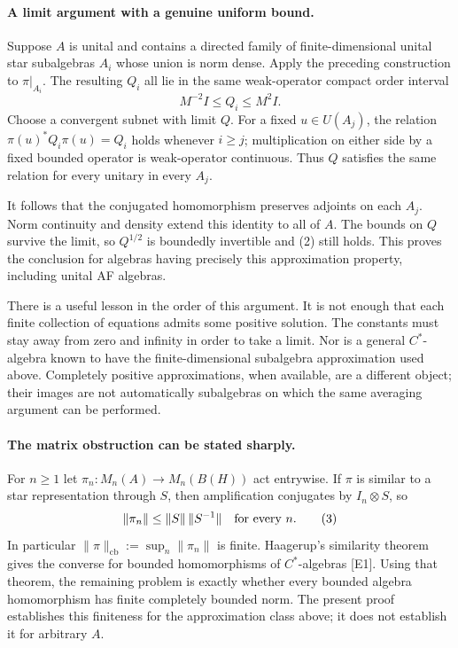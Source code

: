\documentclass[11pt]{article}
\begin{document}
\paragraph{A limit argument with a genuine uniform bound.}
Suppose $A$ is unital and contains a directed family of finite-dimensional unital star subalgebras $A_i$ whose union is norm dense. Apply the preceding construction to $\pi|_{A_i}$. The resulting $Q_i$ all lie in the same weak-operator compact order interval
\[
 M^{-2}I\le Q_i\le M^2I.
\]
Choose a convergent subnet with limit $Q$. For a fixed $u\in U(A_j)$, the relation $\pi(u)^*Q_i\pi(u)=Q_i$ holds whenever $i\ge j$; multiplication on either side by a fixed bounded operator is weak-operator continuous. Thus $Q$ satisfies the same relation for every unitary in every $A_j$.

It follows that the conjugated homomorphism preserves adjoints on each $A_j$. Norm continuity and density extend this identity to all of $A$. The bounds on $Q$ survive the limit, so $Q^{1/2}$ is boundedly invertible and (2) still holds. This proves the conclusion for algebras having precisely this approximation property, including unital AF algebras.

There is a useful lesson in the order of this argument. It is not enough that each finite collection of equations admits some positive solution. The constants must stay away from zero and infinity in order to take a limit. Nor is a general $C^*$-algebra known to have the finite-dimensional subalgebra approximation used above. Completely positive approximations, when available, are a different object; their images are not automatically subalgebras on which the same averaging argument can be performed.

\paragraph{The matrix obstruction can be stated sharply.}
For $n\ge1$ let $\pi_n:M_n(A)\to M_n(B(H))$ act entrywise. If $\pi$ is similar to a star representation through $S$, then amplification conjugates by $I_n\otimes S$, so
\[
 \|\pi_n\|\le\|S\|\,\|S^{-1}\|\quad\hbox{for every }n.
                                                               \tag{3}
\]
In particular $\|\pi\|_{\mathrm{cb}}:=\sup_n\|\pi_n\|$ is finite. Haagerup's similarity theorem gives the converse for bounded homomorphisms of $C^*$-algebras [E1]. Using that theorem, the remaining problem is exactly whether every bounded algebra homomorphism has finite completely bounded norm. The present proof establishes this finiteness for the approximation class above; it does not establish it for arbitrary $A$.
\end{document}
